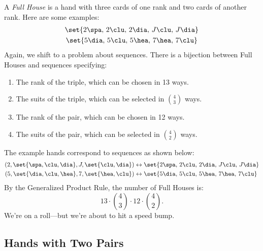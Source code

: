 A \emph{Full House} is a hand with three cards of one rank and
two cards of another rank.  Here are some examples:
%
\begin{gather*}
\set{ 2 \spa, \, 2 \clu, \, 2 \dia, \, J \clu, \, J \dia } \\
\set{ 5 \dia, \, 5 \clu, \, 5 \hea, \, 7 \hea, \, 7 \clu }
\end{gather*}
%
Again, we shift to a problem about sequences.  There is a bijection
between Full Houses and sequences specifying:
%
\begin{enumerate}
\item The rank of the triple, which can be chosen in 13 ways.
\item The suits of the triple, which can be selected in $\binom{4}{3}$ ways.
\item The rank of the pair, which can be chosen in 12 ways.
\item The suits of the pair, which can be selected in $\binom{4}{2}$ ways.
\end{enumerate}
%
The example hands correspond to sequences as shown below:
\begin{align*}
(2, \set{\spa, \clu, \dia}, J, \set{\clu, \dia})
    & \leftrightarrow
    \set{ 2 \spa, \, 2 \clu, \, 2 \dia, \, J \clu, \, J \dia } \\
(5, \set{\dia, \clu, \hea}, 7, \set{\hea, \clu})
    & \leftrightarrow
    \set{ 5 \dia, \, 5 \clu, \, 5 \hea, \, 7 \hea, \, 7 \clu }
\end{align*}
%
By the Generalized Product Rule, the number of Full Houses is:
%
\[
    13 \cdot \binom{4}{3} \cdot 12 \cdot \binom{4}{2}.
\]
%
We're on a roll---but we're about to hit a speed bump.

\subsection{Hands with Two Pairs}

